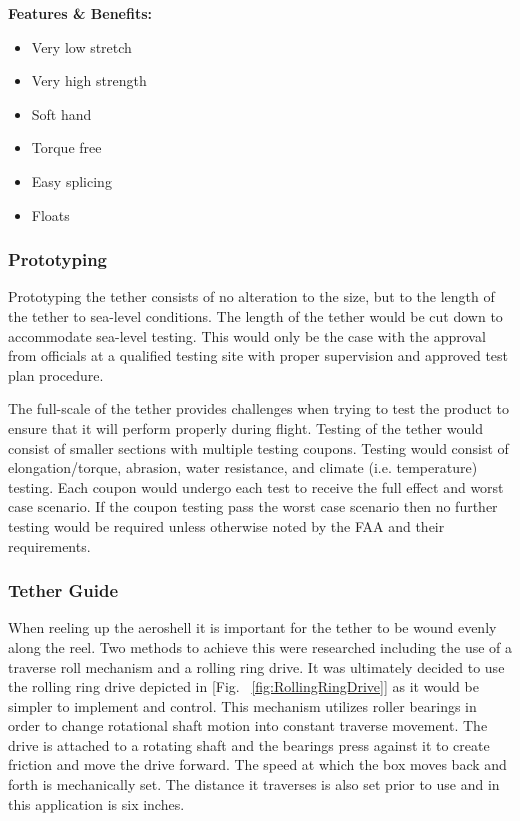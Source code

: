 \textbf{Features \& Benefits:}

\begin{itemize}[noitemsep]
  \item Very low stretch
  \item Very high strength
  \item Soft hand
  \item Torque free
  \item Easy splicing
  \item Floats
\end{itemize}

\subsubsection*{Prototyping}

\indent\indent Prototyping the tether consists of no alteration to the size, but to the length of the tether to sea-level conditions. The length of the tether would be cut down to accommodate sea-level testing. This would only be the case with the approval from officials at a qualified testing site with proper supervision and approved test plan procedure.

\indent\indent The full-scale of the tether provides challenges when trying to test the product to ensure that it will perform properly during flight. Testing of the tether would consist of smaller sections with multiple testing coupons. Testing would consist of elongation/torque, abrasion, water resistance, and climate (i.e. temperature) testing. Each coupon would undergo each test to receive the full effect and worst case scenario. If the coupon testing pass the worst case scenario then no further testing would be required unless otherwise noted by the FAA and their requirements.

\subsubsection{Tether Guide}

\indent\indent When reeling up the aeroshell it is important for the tether to be wound evenly along the reel. Two methods to achieve this were researched including the use of a traverse roll mechanism and a rolling ring drive. It was ultimately decided to use the rolling ring drive depicted in [Fig. ~\ref{fig:RollingRingDrive}] as it would be simpler to implement and control. This mechanism utilizes roller bearings in order to change rotational shaft motion into constant traverse movement. The drive is attached to a rotating shaft and the bearings press against it to create friction and move the drive forward. The speed at which the box moves back and forth is mechanically set. The distance it traverses is also set prior to use and in this application is six inches. 

